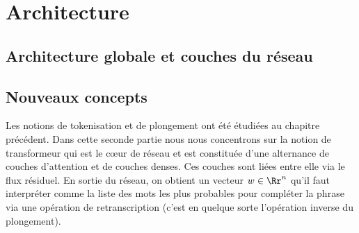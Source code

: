 \documentclass[11pt,class=report,crop=false]{standalone}
\begin{document}







\section{Architecture}

\subsection{Architecture globale et couches du réseau}


\begin{center}
	\begin{minipage}{0.49\textwidth}
		\small	
	\end{minipage}
	\begin{minipage}{0.49\textwidth}
		
	\end{minipage}
\end{center}

\subsection{Nouveaux concepts}

Les notions de tokenisation et de plongement ont été étudiées au chapitre précédent. Dans cette seconde partie nous nous concentrons sur la notion de transformeur qui est le c\oe ur de réseau et est constituée d'une alternance de couches d'attention et de couches denses. Ces couches sont liées entre elle via le flux résiduel. En sortie du réseau, on obtient un vecteur $w\in \Rr^n$ qu'il faut interpréter comme la liste des mots les plus probables pour compléter la phrase via une opération de retranscription (c'est en quelque sorte l'opération inverse du plongement).
\end{document}
